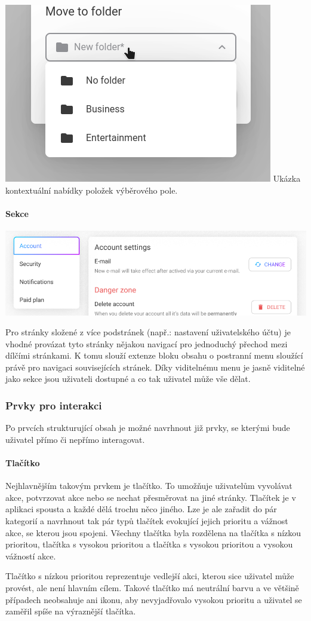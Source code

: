 			\includegraphics[width=0.24\linewidth]{obrazky/kontextualni_nabidka_vyberove_pole_ukazka.png}\hfill
			Ukázka kontextuální nabídky položek výběrového pole. %

			\paragraph{Sekce}

			\includegraphics[width=0.24\linewidth]{obrazky/sekce.png}\hfill

			Pro stránky složené z více podstránek (např.: nastavení uživatelského účtu) je vhodné provázat tyto stránky
			nějakou navigací pro jednoduchý přechod mezi dílčími stránkami.
			K tomu slouží extenze bloku obsahu o postranní menu sloužící právě pro navigaci souvisejících stránek.
			Díky viditelnému menu je jasně viditelné jako sekce jsou uživateli dostupné a co tak uživatel může vše dělat.

		\subsubsection{Prvky pro interakci}

		Po prvcích strukturující obsah je možné navrhnout již prvky, se kterými bude uživatel přímo či nepřímo interagovat.

			\paragraph{Tlačítko}

			Nejhlavnějším takovým prvkem je tlačítko.
			To umožňuje uživatelům vyvolávat akce, potvrzovat akce nebo se nechat přesměrovat na jiné stránky.
			Tlačítek je v aplikaci spousta a každé dělá trochu něco jiného.
			Lze je ale zařadit do pár kategorií a navrhnout tak pár typů tlačítek evokující jejich prioritu a vážnost akce,
			se kterou jsou spojeni.
			Všechny tlačítka byla rozdělena na tlačítka s nízkou prioritou, tlačítka s vysokou prioritou a tlačítka s vysokou
			prioritou a vysokou vážností akce.

			Tlačítko s nízkou prioritou reprezentuje vedlejší akci, kterou sice uživatel může provést, ale není hlavním cílem.
			Takové tlačítko má neutrální barvu a ve většině případech neobsahuje ani ikonu, aby nevyjadřovalo vysokou prioritu
			a uživatel se zaměřil spíše na výraznější tlačítka.

